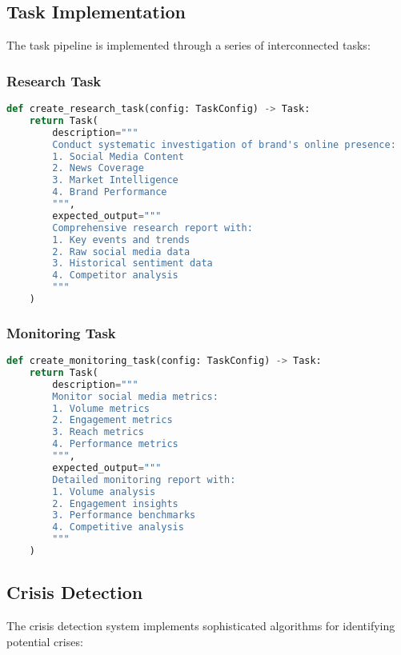 \subsection{Task Implementation}
The task pipeline is implemented through a series of interconnected tasks:

\subsubsection{Research Task}
\begin{lstlisting}[language=Python]
def create_research_task(config: TaskConfig) -> Task:
    return Task(
        description="""
        Conduct systematic investigation of brand's online presence:
        1. Social Media Content
        2. News Coverage
        3. Market Intelligence
        4. Brand Performance
        """,
        expected_output="""
        Comprehensive research report with:
        1. Key events and trends
        2. Raw social media data
        3. Historical sentiment data
        4. Competitor analysis
        """
    )
\end{lstlisting}

\subsubsection{Monitoring Task}
\begin{lstlisting}[language=Python]
def create_monitoring_task(config: TaskConfig) -> Task:
    return Task(
        description="""
        Monitor social media metrics:
        1. Volume metrics
        2. Engagement metrics
        3. Reach metrics
        4. Performance metrics
        """,
        expected_output="""
        Detailed monitoring report with:
        1. Volume analysis
        2. Engagement insights
        3. Performance benchmarks
        4. Competitive analysis
        """
    )
\end{lstlisting}

\subsection{Crisis Detection}
The crisis detection system implements sophisticated algorithms for identifying potential crises:

